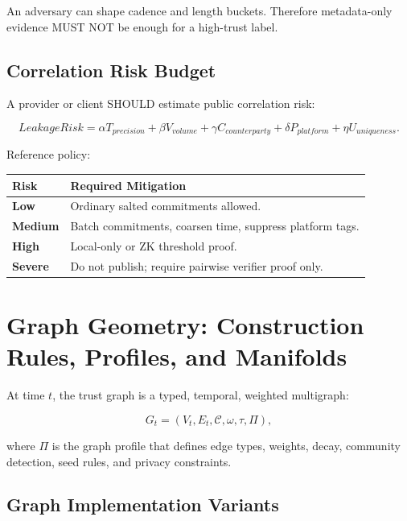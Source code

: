 \documentclass[11pt]{article}
\begin{document}
An adversary can shape cadence and length buckets. Therefore metadata-only evidence MUST NOT be enough for a high-trust label.

\subsection{Correlation Risk Budget}

A provider or client SHOULD estimate public correlation risk:

\begin{equation}
LeakageRisk=\alpha T_{precision}+\beta V_{volume}+\gamma C_{counterparty}+\delta P_{platform}+\eta U_{uniqueness}.
\end{equation}

Reference policy:

\begin{center}
\begin{tabularx}{\textwidth}{>{\bfseries}p{} X}
\toprule
Risk & Required Mitigation \\
\midrule
Low & Ordinary salted commitments allowed. \\
Medium & Batch commitments, coarsen time, suppress platform tags. \\
High & Local-only or ZK threshold proof. \\
Severe & Do not publish; require pairwise verifier proof only. \\
\bottomrule
\end{tabularx}
\end{center}

\section{Graph Geometry: Construction Rules, Profiles, and Manifolds}

At time \(t\), the trust graph is a typed, temporal, weighted multigraph:

\begin{equation}
G_t=(V_t,E_t,\mathcal{C},\omega,\tau,\Pi),
\end{equation}

where \(\Pi\) is the graph profile that defines edge types, weights, decay, community detection, seed rules, and privacy constraints.

\subsection{Graph Implementation Variants}
\end{document}
